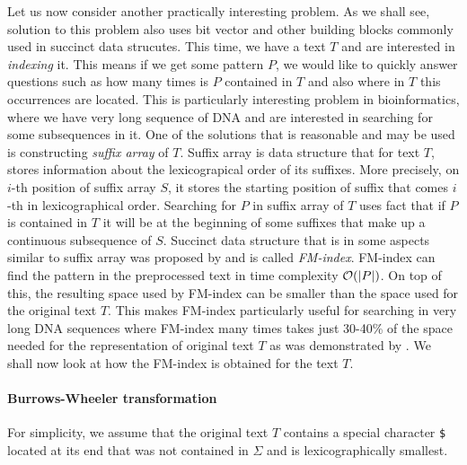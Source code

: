 Let us now consider another practically interesting problem. As we shall see, solution
to this problem also uses bit vector and other building blocks commonly used in succinct
data strucutes. This time, we have a text $T$ and are interested in \textit{indexing} it.
This means if we get some pattern $P$, we would like to quickly answer questions such as
how many times is $P$ contained in $T$ and also where in $T$ this occurrences are located.
This is particularly interesting problem in bioinformatics, where we have very long sequence
of DNA and are interested in searching for some subsequences in it. One of the solutions that
is reasonable and may be used is constructing \textit{suffix array} of $T$. Suffix array is
data structure that for text $T$, stores information about the lexicograpical order of its
suffixes. More precisely, on $i$-th position of suffix array $S$, it stores the starting
position of suffix that comes $i$-th in lexicographical order. Searching for $P$ in suffix
array of $T$ uses fact that if $P$ is contained in $T$ it will be at the beginning of some
suffixes that make up a continuous subsequence of $S$. Succinct data structure that is in
some aspects similar to suffix array was proposed by \cite{ferragina2000opportunistic} and
is called \textit{FM-index}. FM-index can find the pattern in the preprocessed text in time
complexity $\mathcal{O}(|P|)$. On top of this, the resulting space used by FM-index can be
smaller than the space used for the original text $T$. This makes FM-index particularly useful
for searching in very long DNA sequences where FM-index many times takes just 30-40\% of the
space needed for the representation of original text $T$ as was demonstrated by
\cite{ferragina2001experimental}. We shall now look at how the FM-index is obtained for the text
$T$.

\paragraph{Burrows-Wheeler transformation}

For simplicity, we assume that the original text $T$ contains a special character {\tt \$}
located at its end that was not contained in $\Sigma$ and is lexicographically smallest.


